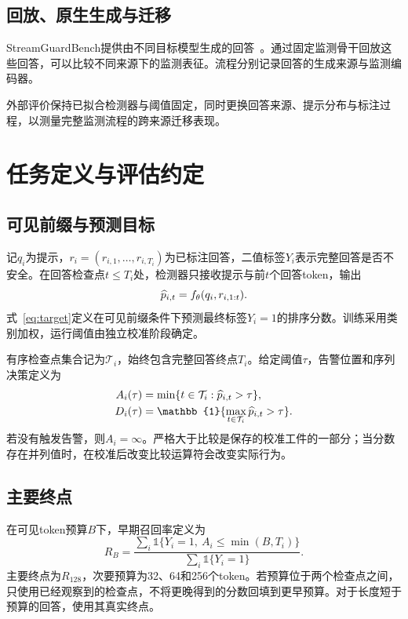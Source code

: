 \subsection{回放、原生生成与迁移}
StreamGuardBench提供由不同目标模型生成的回答~\cite{li2025kelpstreamingsafeguardlarge,streamguardbench2025data}。通过固定监测骨干回放这些回答，可以比较不同来源下的监测表征。流程分别记录回答的生成来源与监测编码器。

外部评价保持已拟合检测器与阈值固定，同时更换回答来源、提示分布与标注过程，以测量完整监测流程的跨来源迁移表现。

\section{任务定义与评估约定}
\subsection{可见前缀与预测目标}
记$q_i$为提示，$r_i=(r_{i,1},\ldots,r_{i,T_i})$为已标注回答，二值标签$Y_i$表示完整回答是否不安全。在回答检查点$t\leq T_i$处，检测器只接收提示与前$t$个回答token，输出
\begin{equation}
 \widehat p_{i,t}=f_\theta(q_i,r_{i,1:t}).
 \label{eq:target}
\end{equation}
式~\ref{eq:target}定义在可见前缀条件下预测最终标签$Y_i=1$的排序分数。训练采用类别加权，运行阈值由独立校准阶段确定。

有序检查点集合记为$\mathcal T_i$，始终包含完整回答终点$T_i$。给定阈值$\tau$，告警位置和序列决策定义为
\begin{align*}
 A_i(\tau)&=\min\{t\in\mathcal T_i:\risk_{i,t}>\tau\},\\
 D_i(\tau)&=\mathbb{1}\{\max_{t\in\mathcal T_i}\risk_{i,t}>\tau\}.
\end{align*}
若没有触发告警，则$A_i=\infty$。严格大于比较是保存的校准工件的一部分；当分数存在并列值时，在校准后改变比较运算符会改变实际行为。

\subsection{主要终点}
在可见token预算$B$下，早期召回率定义为
\begin{equation}
 R_B=\frac{\sum_i\mathbb{1}\{Y_i=1,\ A_i\leq\min(B,T_i)\}}
 {\sum_i\mathbb{1}\{Y_i=1\}}.
 \label{eq:recall}
\end{equation}
主要终点为$R_{128}$，次要预算为32、64和256个token。若预算位于两个检查点之间，只使用已经观察到的检查点，不将更晚得到的分数回填到更早预算。对于长度短于预算的回答，使用其真实终点。

